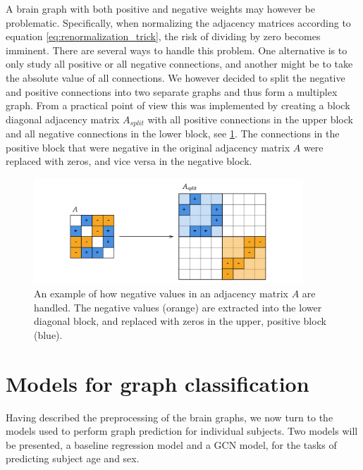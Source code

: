 A brain graph with both positive and negative weights may however be problematic. Specifically, when normalizing the adjacency matrices according to equation \eqref{eq:renormalization_trick}, the risk of dividing by zero becomes imminent. There are several ways to handle this problem. One alternative is to only study all positive or all negative connections, and another might be to take the absolute value of all connections. We however decided to split the negative and positive connections into two separate graphs and thus form a multiplex graph. From a practical point of view this was implemented by creating a block diagonal adjacency matrix $A_{split}$ with all positive connections in the upper block and all negative connections in the lower block, see \cref{fig:block_diagonal_adjacency_matrix}. The connections in the positive block that were negative in the original adjacency matrix $A$ were replaced with zeros, and vice versa in the negative block.

\begin{figure}[H]
    \centering
    \includegraphics[width=0.9\textwidth]{chapters/images_methods/split.png}
    \caption{An example of how negative values in an adjacency matrix $A$ are handled. The negative values (orange) are extracted into the lower diagonal block, and replaced with zeros in the upper, positive block (blue).}
    \label{fig:block_diagonal_adjacency_matrix}
\end{figure}

\section{Models for graph classification}

Having described the preprocessing of the brain graphs, we now turn to the models used to perform graph prediction for individual subjects. Two models will be presented, a baseline regression model and a GCN model, for the tasks of predicting subject age and sex.

